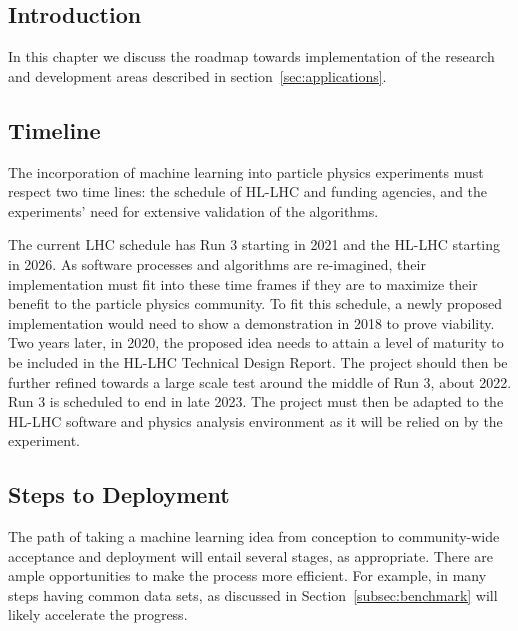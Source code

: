 

\subsection{Introduction}
In this chapter we discuss the roadmap towards implementation of the research and development areas described in section~\ref{sec:applications}.

\subsection{Timeline}
The incorporation of machine learning into particle physics experiments must respect two time lines: the schedule of HL-LHC and funding agencies, and the experiments' need for extensive validation of the algorithms.

The current LHC schedule has Run 3 starting in 2021 and the HL-LHC starting in 2026. As software processes and algorithms are re-imagined, their implementation must fit into these time frames if they are to maximize their benefit to the particle physics community. To fit this schedule, a newly proposed implementation would need to show a demonstration in 2018 to prove viability. Two years later, in 2020, the proposed idea needs to attain a level of maturity to be included in the HL-LHC Technical Design Report. The project should then be further refined towards a large scale test around the middle of Run 3, about 2022. Run 3 is scheduled to end in late 2023. The project must then be adapted to the HL-LHC software and physics analysis environment as it will be relied on by the experiment.

%

\subsection{Steps to Deployment}
The path of taking a machine learning idea from conception to community-wide acceptance and deployment will entail several stages, as appropriate. There are ample opportunities to make the process more efficient. For example, in many steps having common data sets, as discussed in Section~\ref{subsec:benchmark} will likely accelerate the progress.

